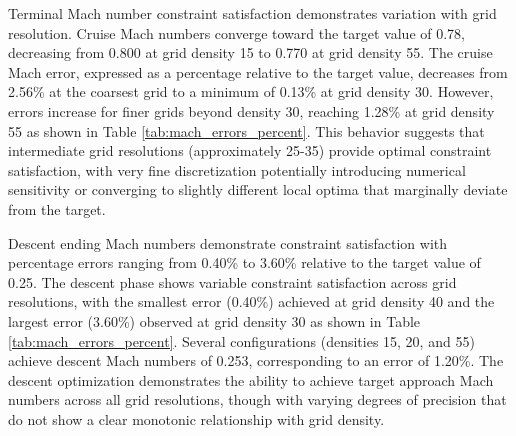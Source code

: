 Terminal Mach number constraint satisfaction demonstrates variation with grid resolution. Cruise Mach numbers converge toward the target value of 0.78, decreasing from 0.800 at grid density 15 to 0.770 at grid density 55. The cruise Mach error, expressed as a percentage relative to the target value, decreases from 2.56\% at the coarsest grid to a minimum of 0.13\% at grid density 30. However, errors increase for finer grids beyond density 30, reaching 1.28\% at grid density 55 as shown in Table \ref{tab:mach_errors_percent}. This behavior suggests that intermediate grid resolutions (approximately 25-35) provide optimal constraint satisfaction, with very fine discretization potentially introducing numerical sensitivity or converging to slightly different local optima that marginally deviate from the target.

Descent ending Mach numbers demonstrate constraint satisfaction with percentage errors ranging from 0.40\% to 3.60\% relative to the target value of 0.25. The descent phase shows variable constraint satisfaction across grid resolutions, with the smallest error (0.40\%) achieved at grid density 40 and the largest error (3.60\%) observed at grid density 30  as shown in Table \ref{tab:mach_errors_percent}. Several configurations (densities 15, 20, and 55) achieve descent Mach numbers of 0.253, corresponding to an error of 1.20\%. The descent optimization demonstrates the ability to achieve target approach Mach numbers across all grid resolutions, though with varying degrees of precision that do not show a clear monotonic relationship with grid density.



